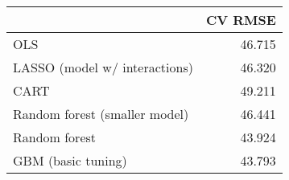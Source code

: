 
\begin{tabular}{lr}
\toprule
  & CV RMSE\\
\midrule
OLS & 46.715\\
LASSO (model w/ interactions) & 46.320\\
CART & 49.211\\
Random forest (smaller model) & 46.441\\
Random forest & 43.924\\
GBM (basic tuning) & 43.793\\
\bottomrule
\end{tabular}